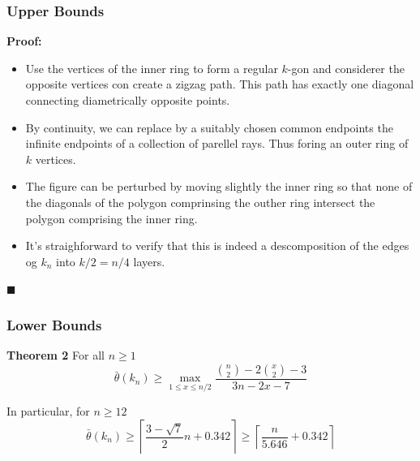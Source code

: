 \documentclass[12 pt]{beamer}
\begin{document}
\begin{frame}{}
    \frametitle{Upper Bounds}

    \textbf{Proof:}
    
    \begin{itemize}
        \item Use the vertices of the inner ring to form a regular $k$-gon and considerer the opposite vertices con create a zigzag path. This path has exactly one diagonal connecting diametrically opposite points. 
        
        \item By continuity, we can replace by a suitably chosen common endpoints the infinite endpoints of a collection of parellel rays. Thus foring an outer ring of $k$ vertices.
        
        \item The figure can be perturbed by moving slightly the inner ring so that none of the diagonals of the polygon comprinsing the outher ring intersect the polygon comprising the inner ring.
        
        \item It's straighforward to verify that this is indeed a descomposition of the edges og $k_n$ into $k/2 = n/4$ layers.
    \end{itemize}
    
    \begin{flushright}
    $\blacksquare$
    \end{flushright}
\end{frame}

\begin{frame}{}
    \frametitle{Lower Bounds}
    
    \begin{block}{\textbf{Theorem 2}} 
    For all $n \geq 1$
    $$\bar{\theta} (k_{n}) \geq \max_{1 \leq x \leq n/2} \frac{\binom{n}{2} - 2\binom{x}{2} - 3}{3n - 2x - 7}$$
    \end{block}
    
    \pause
    
    \begin{exampleblock}{In particular, for $n \geq 12$}
    $$
    \bar{\theta} (k_{n}) \geq \left \lceil \frac{3 - \sqrt{7}}{2}n + 0.342 \right \rceil  \geq \left \lceil \frac{n}{5.646} + 0.342 \right  \rceil 
    $$
    \end{exampleblock}
\end{frame}
\end{document}
